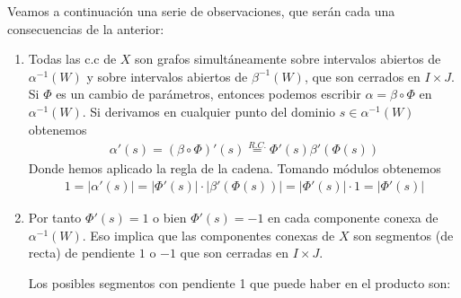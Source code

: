 \begin{observacion}
    Veamos a continuación una serie de observaciones, que serán cada una consecuencias de la anterior:

    \begin{enumerate}
        \item\label{obs:cc_grafos} Todas las c.c de $X$ son grafos simultáneamente sobre intervalos abiertos de $\alpha^{-1}(W)$ y sobre intervalos abiertos de $\beta^{-1}(W)$, que son cerrados en $I\times J$.\\
        
        Si $\Phi$ es un cambio de parámetros, entonces podemos escribir $\alpha = \beta \circ \Phi$ en $\alpha^{-1}(W)$. Si derivamos en cualquier punto del dominio $s\in \alpha^{-1}(W)$ obtenemos
        \begin{gather*}
            \alpha'(s) = (\beta \circ \Phi)'(s) \overset{R.C.}{=} \Phi'(s)\beta'(\Phi(s))
        \end{gather*}
        Donde hemos aplicado la regla de la cadena. Tomando módulos obtenemos 
        \begin{gather*}
            1 = |\alpha'(s)| = |\Phi'(s)| \cdot |\beta'(\Phi(s))| = |\Phi'(s)| \cdot 1 = |\Phi'(s)|
        \end{gather*}
        \item Por tanto $\Phi'(s) = 1$ o bien $\Phi'(s) = -1$ en cada componente conexa de $\alpha^{-1}(W)$. Eso implica que las componentes conexas de $X$ son segmentos (de recta) de pendiente $1$ o $-1$ que son cerradas en $I\times J$.

        Los posibles segmentos con pendiente 1 que puede haber en el producto son:
        \begin{figure}[H]
            \centering
            \begin{subfigure}[b]{0.31\textwidth}
                \centering
            \end{subfigure}%
            \hspace{0.2cm}%
            \begin{subfigure}[b]{0.31\textwidth}
                \centering
\end{subfigure}
\end{figure}
\end{enumerate}
\end{observacion}

